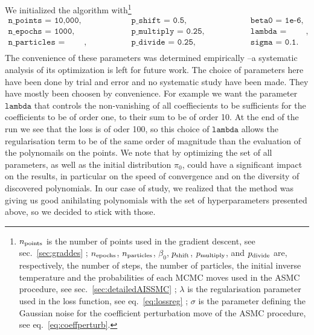 \documentclass[11pt,a4paper]{article}
\begin{document}
	We initialized the algorithm with\footnote{$n_{\rm points}$ is the number of points used in the gradient descent, see sec.~\ref{sec:graddes} ; $n_{\rm epochs}$, $n_{\rm particles}$, $\beta_{0}$, $p_{\rm shift}$, $p_{\rm multiply}$, and $p_{\rm divide}$ are, respectively, the number of steps, the number of particles, the initial inverse temperature and the probabilities of each MCMC moves used in the ASMC procedure, see sec.~\ref{sec:detailedAISSMC} ; $\lambda$ is the regularisation parameter used in the loss function, see eq.~\eqref{eq:lossreg} ; $\sigma$ is the parameter defining the Gaussian noise for the coefficient perturbation move of the ASMC procedure, see eq.~\eqref{eq:coeffperturb}.}
	\begin{equation}	\label{eq:sample10000adaptativetemp}
		\begin{array}{lllll}
			\texttt{n\_points = 10,000}, & \qquad \qquad &  \texttt{p\_{shift} = 0.5}, & \qquad \qquad & \texttt{beta0  = 1e-6}, \\
			\texttt{n\_epochs = 1000}, & &\texttt{p\_{multiply} = 0.25}, & & \texttt{lambda = 1000}, \\
			\texttt{n\_particles = 1000}, & & \texttt{p\_{divide} = 0.25}, & & \texttt{sigma = 0.1}.\\
		\end{array}
	\end{equation}
	The convenience of these parameters was determined empirically --a systematic analysis of its optimization is left for future work. The choice of parameters here have been done by trial and error and no systematic study have been made. They have mostly been choosen by convenience. For example we want the parameter $\texttt{lambda}$ that controls the non-vanishing of all coeffiecients to be sufficients for the coefficients to be of order one, to their sum to be of order 10. At the end of the run we see that the loss is of oder 100, so this choice of $\texttt{lambda}$ allows the regularisation term to be of the same order of magnitude than the evaluation of the polynomails on the points. We note that by optimizing the set of all parameters, as well as the initial distribution $\pi_0$, could have a significant impact on the results, in particular on the speed of convergence and on the diversity of discovered polynomials. In our case of study, we realized that the method was giving us good anihilating polynomials with the set of hyperparameters presented above, so we decided to stick with those. 
	
\end{document}
